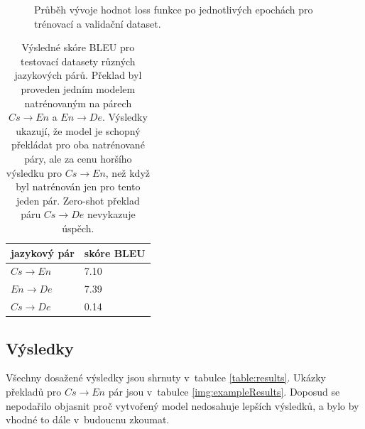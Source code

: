\begin{figure}[H]
    \begin{center}
    \end{center}
	\caption{Průběh vývoje hodnot loss funkce po jednotlivých epochách pro trénovací a validační dataset.}
\end{figure}

\begin{table}[H]
    \begin{center}
        \begin{tabular}{ll}
          \toprule
          jazykový pár & skóre BLEU \\
          \midrule
          $Cs\rightarrow En$ & 7.10 \\
          $En\rightarrow De$ & 7.39 \\
          $Cs\rightarrow De$ &  0.14 \\
          \bottomrule
        \end{tabular}
    \end{center}
	\caption{Výsledné skóre BLEU pro testovací datasety různých jazykových párů. Překlad byl proveden jedním modelem natrénovaným na párech $Cs\rightarrow En$ a $En\rightarrow De$. Výsledky ukazují, že model je schopný překládat pro oba natrénované páry, ale za cenu horšího výsledku pro $Cs\rightarrow En$, než když byl natrénován jen pro tento jeden pár. Zero-shot překlad páru $Cs\rightarrow De$ nevykazuje úspěch.}
	\label{table:resultsMulti}
\end{table}

\subsection{Výsledky}
Všechny dosažené výsledky jsou shrnuty v~tabulce \ref{table:results}. Ukázky překladů pro $Cs\rightarrow En$ pár jsou v~tabulce \ref{img:exampleResults}. Doposud se nepodařilo objasnit proč vytvořený model nedosahuje lepších výsledků, a bylo by vhodné to dále v~budoucnu zkoumat.

